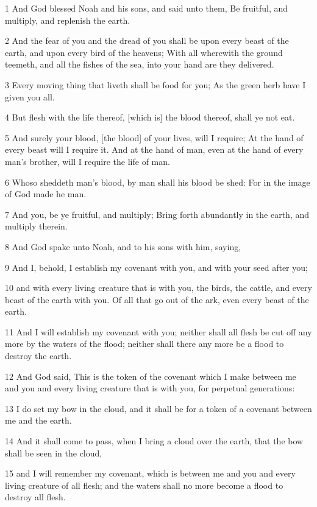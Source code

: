 \par 1 And God blessed Noah and his sons, and said unto them, Be fruitful, and multiply, and replenish the earth.
\par 2 And the fear of you and the dread of you shall be upon every beast of the earth, and upon every bird of the heavens; With all wherewith the ground teemeth, and all the fishes of the sea, into your hand are they delivered.
\par 3 Every moving thing that liveth shall be food for you; As the green herb have I given you all.
\par 4 But flesh with the life thereof, [which is] the blood thereof, shall ye not eat.
\par 5 And surely your blood, [the blood] of your lives, will I require; At the hand of every beast will I require it. And at the hand of man, even at the hand of every man's brother, will I require the life of man.
\par 6 Whoso sheddeth man's blood, by man shall his blood be shed: For in the image of God made he man.
\par 7 And you, be ye fruitful, and multiply; Bring forth abundantly in the earth, and multiply therein.
\par 8 And God spake unto Noah, and to his sons with him, saying,
\par 9 And I, behold, I establish my covenant with you, and with your seed after you;
\par 10 and with every living creature that is with you, the birds, the cattle, and every beast of the earth with you. Of all that go out of the ark, even every beast of the earth.
\par 11 And I will establish my covenant with you; neither shall all flesh be cut off any more by the waters of the flood; neither shall there any more be a flood to destroy the earth.
\par 12 And God said, This is the token of the covenant which I make between me and you and every living creature that is with you, for perpetual generations:
\par 13 I do set my bow in the cloud, and it shall be for a token of a covenant between me and the earth.
\par 14 And it shall come to pass, when I bring a cloud over the earth, that the bow shall be seen in the cloud,
\par 15 and I will remember my covenant, which is between me and you and every living creature of all flesh; and the waters shall no more become a flood to destroy all flesh.
